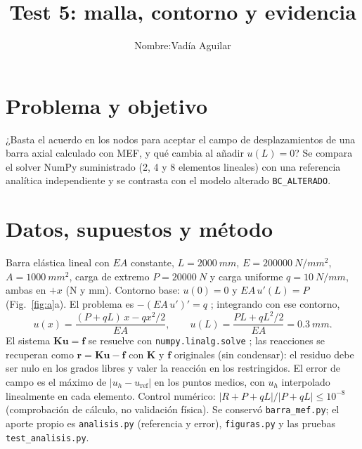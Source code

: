 \documentclass[11pt]{article}
\title{Test 5: malla, contorno y evidencia}
\author{Nombre:Vadía Aguilar}
\date{}
\begin{document}
\maketitle
\section{Problema y objetivo}
¿Basta el acuerdo en los nodos para aceptar el campo de desplazamientos de una barra axial calculado con MEF, y qué cambia al añadir $u(L)=0$? Se compara el solver NumPy suministrado (2, 4 y 8 elementos lineales) con una referencia analítica independiente y se contrasta con el modelo alterado \texttt{BC\_ALTERADO}.

\section{Datos, supuestos y método}
Barra elástica lineal con $EA$ constante, $L=\SI{2000}{mm}$, $E=\SI{200000}{N/mm^2}$, $A=\SI{1000}{mm^2}$, carga de extremo $P=\SI{20000}{N}$ y carga uniforme $q=\SI{10}{N/mm}$, ambas en $+x$ (N y mm). Contorno base: $u(0)=0$ y $EA\,u'(L)=P$ (Fig.~\ref{fig:a}a). El problema es $-(EA\,u')'=q$ \cite{rod}; integrando con ese contorno,
\begin{equation}
u(x)=\frac{(P+qL)\,x-qx^2/2}{EA},\qquad u(L)=\frac{PL+qL^2/2}{EA}=\SI{0.3}{mm}.
\end{equation}
El sistema $\mathbf{K}\mathbf{u}=\mathbf{f}$ se resuelve con \texttt{numpy.linalg.solve} \cite{numpy}; las reacciones se recuperan como $\mathbf{r}=\mathbf{K}\mathbf{u}-\mathbf{f}$ con $\mathbf{K}$ y $\mathbf{f}$ originales (sin condensar): el residuo debe ser nulo en los grados libres y valer la reacción en los restringidos. El error de campo es el máximo de $|u_h-u_{\mathrm{ref}}|$ en los puntos medios, con $u_h$ interpolado linealmente en cada elemento. Control numérico: $|R+P+qL|/|P+qL|\le 10^{-8}$ (comprobación de cálculo, no validación física). Se conservó \texttt{barra\_mef.py}; el aporte propio es \texttt{analisis.py} (referencia y error), \texttt{figuras.py} y las pruebas \texttt{test\_analisis.py}.
\end{document}

